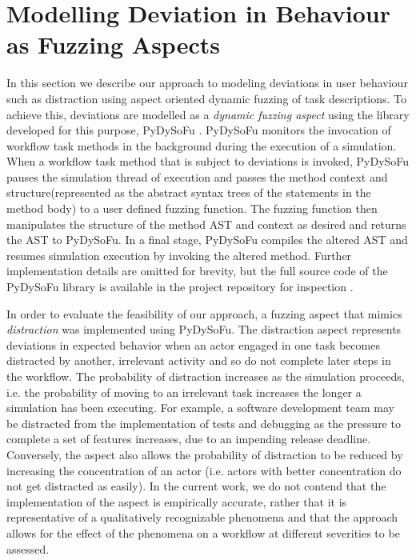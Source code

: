 \documentclass{llncs}
\begin{document}

\section{Modelling Deviation in Behaviour as Fuzzing Aspects}
\label{sec:fuzzing}


In this section we describe our approach to modeling deviations in user behaviour such as distraction using aspect
oriented dynamic fuzzing of task descriptions.  To achieve this, deviations are modelled as a \emph{dynamic fuzzing
  aspect} using the library developed for this purpose, PyDySoFu \cite{storer2016pydysofu-scm}.  PyDySoFu monitors the
invocation of workflow task methods in the background during the execution of a simulation.  When a workflow task method
that is subject to deviations is invoked, PyDySoFu pauses the simulation thread of execution and passes the method
context and structure(represented as the abstract syntax trees of the statements in the method body) to a user defined
fuzzing function.  The fuzzing function then manipulates the structure of the method AST and context as desired and
returns the AST to PyDySoFu.  In a final stage, PyDySoFu compiles the altered AST and resumes simulation execution by
invoking the altered method.  Further implementation details are omitted for brevity, but the full source code of the
PyDySoFu library is available in the project repository for inspection \cite{storer2016pydysofu-scm}.

In order to evaluate the feasibility of our approach, a fuzzing aspect that mimics \emph{distraction} was implemented
using PyDySoFu.  The distraction aspect represents deviations in expected behavior when an actor engaged in one task
becomes distracted by another, irrelevant activity and so do not complete later steps in the workflow.  The probability
of distraction increases as the simulation proceeds, i.e. the probability of moving to an irrelevant task increases the
longer a simulation has been executing.  For example, a software development team may be distracted from the
implementation of tests and debugging as the pressure to complete a set of features increases, due to an impending
release deadline.  Conversely, the aspect also allows the probability of distraction to be reduced by increasing the
concentration of an actor (i.e. actors with better concentration do not get distracted as easily).  In the current work,
we do not contend that the implementation of the aspect is empirically accurate, rather that it is representative of a
qualitatively recognizable phenomena and that the approach allows for the effect of the phenomena on a workflow at
different severities to be assessed.
\end{document}
